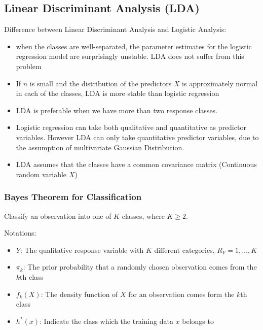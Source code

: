 \documentclass[12pt,a4paper]{article}%
\theoremstyle{definition}
\theoremstyle{plain}
\numberwithin{equation}{section}
\begin{document}
\subsection{\textbf{Linear Discriminant Analysis (LDA)}}

Difference between Linear Discriminant Analysis and Logistic Analysis:
\begin{itemize}
\item when the classes are well-separated, the parameter estimates for the logistic regression model are surprisingly unstable. LDA does not suffer from this problem
\item If $n$ is small and the distribution of the predictors $X$ is approximately normal in each of the classes, LDA is more stable than logistic regression
\item LDA is preferable when we have more than two response classes.
\item Logistic regression can take both qualitative and quantitative as predictor variables. However LDA can only take quantitative predictor variables, due to the assumption of multivariate Gaussian Distribution.
\item LDA assumes that the classes have a common covariance matrix
(Continuous random variable $X$)
\end{itemize}

\subsubsection{\textbf{Bayes Theorem for Classification}}
Classify an observation into one of $K$ classes, where $K \geq 2$.

Notations: 
\begin{itemize}
\item $Y$: The qualitative response variable with $K$ different categories, $R_{Y} = {1,\dots,K}$
\item $\pi_{k}$: The prior probability that a randomly chosen observation comes from the $k$th class
\item $f_{k}(X)$: The density function of $X$ for an observation comes form the $k$th class
\item $h^{*}(x)$: Indicate the class which the training data $x$ belongs to
\end{itemize}
\end{document}
